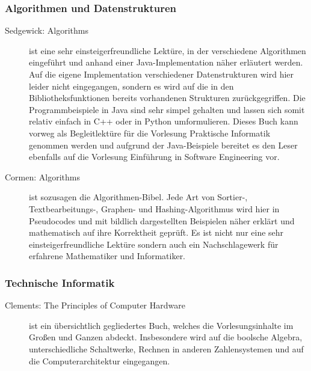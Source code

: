 \subsubsection{Algorithmen und Datenstrukturen}
\begin{description}

\item[Sedgewick: Algorithms]{
	ist eine sehr einsteigerfreundliche Lektüre, in der verschiedene Algorithmen eingeführt und anhand einer Java-Implementation näher erläutert werden. Auf die eigene Implementation verschiedener Datenstrukturen wird hier leider nicht eingegangen, sondern es wird auf die in den Bibliotheksfunktionen bereits vorhandenen Strukturen zurückgegriffen. Die Programmbeispiele in Java sind sehr simpel gehalten und lassen sich somit relativ einfach in C++ oder in Python umformulieren. Dieses Buch kann vorweg als Begleitlektüre für die Vorlesung Praktische Informatik genommen werden und aufgrund der Java-Beispiele bereitet es den Leser ebenfalls auf die Vorlesung Einführung in Software Engineering vor.} 

\item[Cormen: Algorithms]{
	ist sozusagen die Algorithmen-Bibel. Jede Art von Sortier-, Textbearbeitungs-, Graphen- und Hashing-Algorithmus wird hier in Pseudocodes und mit bildlich dargestellten Beispielen näher erklärt und mathematisch auf ihre Korrektheit geprüft. Es ist nicht nur eine sehr einsteigerfreundliche Lektüre sondern auch ein Nachschlagewerk für erfahrene Mathematiker und Informatiker.}
\end{description}

\subsubsection{Technische Informatik}
\begin{description}
\item[Clements: The Principles of Computer Hardware]{
	ist ein übersichtlich gegliedertes Buch, welches die Vorlesungsinhalte im Großen und Ganzen abdeckt. Insbesondere wird auf die boolsche Algebra, unterschiedliche Schaltwerke, Rechnen in anderen Zahlensystemen und auf die Computerarchitektur eingegangen.}
\end{description}

